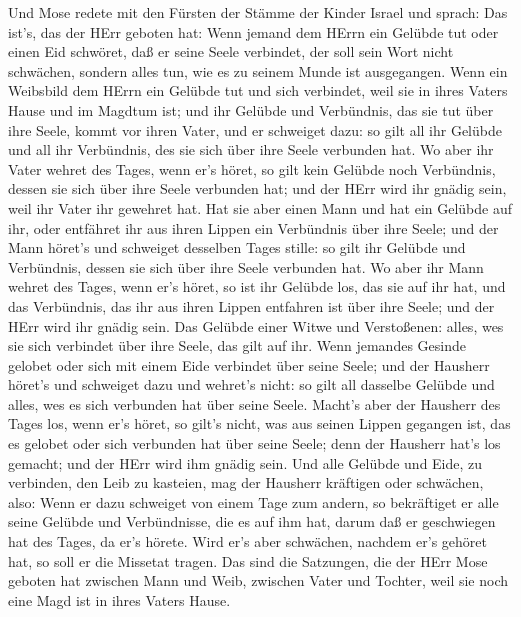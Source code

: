  Und Mose redete mit den Fürsten der Stämme der Kinder
Israel und sprach: Das ist's, das der HErr geboten hat: 
Wenn jemand dem HErrn ein Gelübde tut oder einen Eid schwöret, daß er
seine Seele verbindet, der soll sein Wort nicht schwächen, sondern alles
tun, wie es zu seinem Munde ist ausgegangen.  Wenn ein
Weibsbild dem HErrn ein Gelübde tut und sich verbindet, weil sie in
ihres Vaters Hause und im Magdtum ist;  und ihr Gelübde und
Verbündnis, das sie tut über ihre Seele, kommt vor ihren Vater, und er
schweiget dazu: so gilt all ihr Gelübde und all ihr Verbündnis, des sie
sich über ihre Seele verbunden hat.  Wo aber ihr Vater
wehret des Tages, wenn er's höret, so gilt kein Gelübde noch Verbündnis,
dessen sie sich über ihre Seele verbunden hat; und der HErr wird ihr
gnädig sein, weil ihr Vater ihr gewehret hat.  Hat sie aber
einen Mann und hat ein Gelübde auf ihr, oder entfähret ihr aus ihren
Lippen ein Verbündnis über ihre Seele;  und der Mann höret's
und schweiget desselben Tages stille: so gilt ihr Gelübde und
Verbündnis, dessen sie sich über ihre Seele verbunden hat. 
Wo aber ihr Mann wehret des Tages, wenn er's höret, so ist ihr Gelübde
los, das sie auf ihr hat, und das Verbündnis, das ihr aus ihren Lippen
entfahren ist über ihre Seele; und der HErr wird ihr gnädig sein.
 Das Gelübde einer Witwe und Verstoßenen: alles, wes sie
sich verbindet über ihre Seele, das gilt auf ihr.  Wenn
jemandes Gesinde gelobet oder sich mit einem Eide verbindet über seine
Seele;  und der Hausherr höret's und schweiget dazu und
wehret's nicht: so gilt all dasselbe Gelübde und alles, wes es sich
verbunden hat über seine Seele.  Macht's aber der Hausherr
des Tages los, wenn er's höret, so gilt's nicht, was aus seinen Lippen
gegangen ist, das es gelobet oder sich verbunden hat über seine Seele;
denn der Hausherr hat's los gemacht; und der HErr wird ihm gnädig sein.
 Und alle Gelübde und Eide, zu verbinden, den Leib zu
kasteien, mag der Hausherr kräftigen oder schwächen, also: 
Wenn er dazu schweiget von einem Tage zum andern, so bekräftiget er alle
seine Gelübde und Verbündnisse, die es auf ihm hat, darum daß er
geschwiegen hat des Tages, da er's hörete.  Wird er's aber
schwächen, nachdem er's gehöret hat, so soll er die Missetat tragen.
 Das sind die Satzungen, die der HErr Mose geboten hat
zwischen Mann und Weib, zwischen Vater und Tochter, weil sie noch eine
Magd ist in ihres Vaters Hause.

